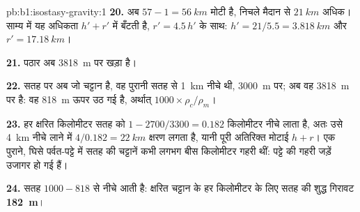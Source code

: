\begin{solution}{pb:b1:isostasy-gravity:1}
\textbf{20.}  अब $57 - 1 = \qty{56}{km}$ मोटी है, निचले मैदान से $\qty{21}{km}$ अधिक। साम्य में यह अधिकता $h' + r'$ में बँटती है, $r' = 4.5\,h'$ के साथ: $h' = 21/5.5 = \qty{3.818}{km}$ और $r' = \qty{17.18}{km}$।

\textbf{21.} पठार अब \qty{3818}{m} पर खड़ा है।

\textbf{22.} सतह पर अब जो चट्टान है, वह पुरानी सतह से \qty{1}{km} नीचे थी, \qty{3000}{m} पर; अब वह \qty{3818}{m} पर है: वह \qty{818}{m} ऊपर उठ गई है, अर्थात् $1000\times\rho_c/\rho_m$।

\textbf{23.} हर क्षरित किलोमीटर सतह को $1 - 2700/3300 =
0.182$ किलोमीटर नीचे लाता है, अतः उसे \qty{4}{km} नीचे लाने में
$4/0.182 = \qty{22}{km}$ क्षरण लगता है, यानी पूरी अतिरिक्त मोटाई $h + r$। एक पुराने, घिसे पर्वत-पट्टे में सतह की चट्टानें कभी लगभग बीस किलोमीटर गहरी थीं: पट्टे की गहरी जड़ें उजागर हो गई हैं।

\textbf{24.} सतह $1000 - 818$ से नीचे आती है: क्षरित चट्टान के हर किलोमीटर के लिए सतह की शुद्ध गिरावट
\textbf{\qty[text-series-to-math=true]{182}{m}}।
\end{solution}
